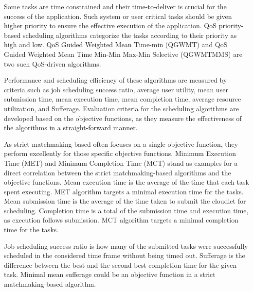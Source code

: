 \documentclass[times, 10pt,twocolumn]{article}
\begin{document}
Some tasks are time constrained and their time-to-deliver is crucial for the success of the application. Such system or user critical tasks should be given higher priority to ensure the effective execution of the application. QoS priority-based scheduling algorithms categorize the tasks according to their priority as high and low. QoS Guided Weighted Mean Time-min (QGWMT) and QoS Guided Weighted Mean Time Min-Min Max-Min Selective (QGWMTMMS) are two such QoS-driven algorithms\cite{qosgrid}. 

Performance and scheduling efficiency of these algorithms are measured by criteria such as job scheduling success ratio, average user utility, mean user submission time, mean execution time, mean completion time, average resource utilization, and Sufferage. Evaluation criteria for the scheduling algorithms are developed based on the objective functions, as they measure the effectiveness of the algorithms in a straight-forward manner. 

As strict matchmaking-based often focuses on a single objective function, they perform excellently for those specific objective functions. Minimum Execution Time (MET) and Minimum Completion Time (MCT) stand as examples for a direct correlation between the strict matchmaking-based algorithms and the objective functions. Mean execution time is the average of the time that each task spent executing. MET algorithm targets a minimal execution time for the tasks. Mean submission time is the average of the time taken to submit the cloudlet for scheduling. Completion time is a total of the submission time and execution time, as execution follows submission. MCT algorithm targets a minimal completion time for the tasks. 

Job scheduling success ratio is how many of the submitted tasks were successfully scheduled in the considered time frame without being timed out. Sufferage is the difference between the best and the second best completion time for the given task\cite{sufferage}. Minimal mean sufferage could be an objective function in a strict matchmaking-based algorithm.
\end{document}
